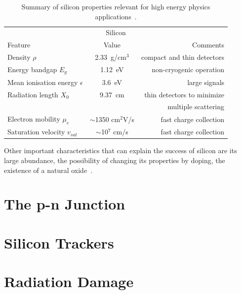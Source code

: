 \begin{table}[htbp]
   \centering
   \begin{tabular}{@{} lcr @{}} %
      \toprule
      \multicolumn{3}{c}{Silicon} \\
      \cmidrule(r){1-3} %
      Feature    & Value & Comments \\
      \midrule
      Density  $\rho$    & 2.33~g/cm${^3}$ & compact and thin detectors  \\
      Energy bandgap $E_g$ & 1.12~eV & non-cryogenic operation \\
      Mean ionisation energy $\epsilon$ & 3.6~eV & large signals\\
      Radiation length $X_0$      &  9.37~cm & thin detectors to minimize  \\
                                       &                 & multiple scattering \\
      Electron mobility  $\mu_e$     & $\sim$1350 cm$^2$V/s  & fast charge collection \\
      Saturation velocity $v_{sat}$ & $\sim$10$^{7}$ cm/s & fast charge collection \\
      \bottomrule
   \end{tabular}
   \caption{Summary of silicon properties relevant for high energy physics applications~\cite{Lutz:411172}.}
   \label{tab:SiProperties}
\end{table}

Other important characteristics that can explain the success of silicon are its large abundance, 
the possibility of changing its properties by doping, the existence of a natural oxide~\cite{Hartmann2012}.

\section{The p-n Junction}
\section{Silicon Trackers}
\section{Radiation Damage}
\label{sec:RadDam}
